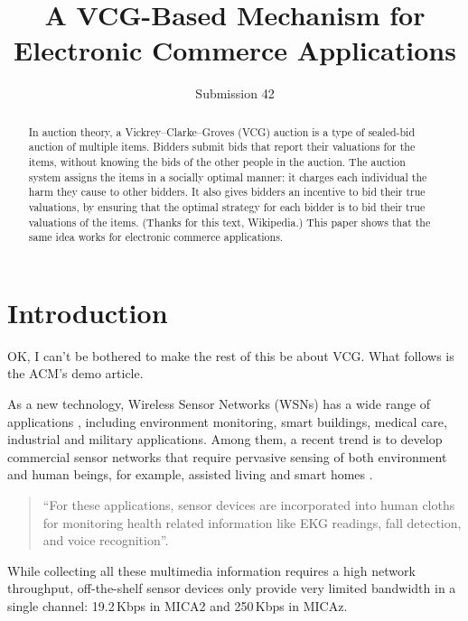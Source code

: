 \documentclass[format=acmsmall, review=false]{acmart}
\begin{document}
\title[A VCG-Based Mechanism for Electronic Commerce]{A VCG-Based Mechanism for Electronic Commerce Applications}  
\author{Submission 42}

\begin{abstract}
In auction theory, a Vickrey--Clarke--Groves (VCG) auction is a type of sealed-bid auction of multiple items. Bidders submit bids that report their valuations for the items, without knowing the bids of the other people in the auction. The auction system assigns the items in a socially optimal manner: it charges each individual the harm they cause to other bidders. It also gives bidders an incentive to bid their true valuations, by ensuring that the optimal strategy for each bidder is to bid their true valuations of the items. (Thanks for this text, Wikipedia.) This paper shows that the same idea works for electronic commerce applications.
\end{abstract}



\maketitle

\section{Introduction}


OK, I can't be bothered to make the rest of this be about VCG. What follows is the ACM's demo article.

As a new technology, Wireless Sensor Networks (WSNs) has a wide
range of applications \cite{Culler-01, Bahl-02, Akyildiz-01}, including
environment monitoring, smart buildings, medical care, industrial and
military applications. Among them, a recent trend is to develop
commercial sensor networks that require pervasive sensing of both
environment and human beings, for example, assisted living
\cite{Akyildiz-02, Harvard-01,CROSSBOW} and smart homes
\cite{Harvard-01, Adya-01,CROSSBOW}.
\begin{quote}
	``For these applications, sensor devices are incorporated into human
	cloths \cite{Natarajan-01, Zhou-06, Bahl-02, Adya-01} for monitoring
	health related information like EKG readings, fall detection, and
	voice recognition''.
\end{quote}
While collecting all these multimedia information
\cite{Akyildiz-02} requires a high network throughput, off-the-shelf
sensor devices only provide very limited bandwidth in a single
channel: 19.2\,Kbps in MICA2 \cite{Bahl-02} and 250\,Kbps in MICAz.
\end{document}
